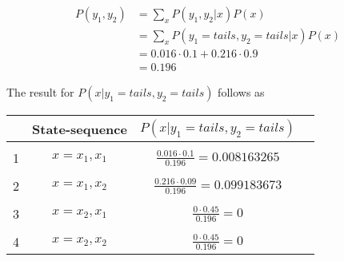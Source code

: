 \documentclass[a4paper, 12pt, titlepage]{article}
\begin{document}
\begin{align}
  P(y_1,y_2) &= \sum_{x} P(y_1,y_2|x) P(x)  \\
	     &= \sum_{x} P(y_1=tails,y_2=tails|x) P(x) \\
	     &= 0.016 \cdot 0.1 + 0.216 \cdot 0.9 \\
	     &= 0.196
\end{align}

The result for $P(x|y_1=tails,y_2=tails)$ follows as

\begin{tabular}{l*{2}{c}r}
              & State-sequence &  $P(x|y_1=tails,y_2=tails)$ & \\
\hline
& & & \\
1 & $x=x_1,x_1$ & $\frac{0.016 \cdot 0.1}{0.196} = 0.008163265$ \\
& & & \\
2 & $x=x_1,x_2$ & $\frac{0.216 \cdot 0.09}{0.196} =0.099183673$ \\
& & & \\
3 & $x=x_2,x_1$ & $\frac{0\cdot 0.45}{0.196} = 0$ \\
& & & \\
4 & $x=x_2,x_2$ & $\frac{0 \cdot 0.45}{0.196} = 0 $ 
 \end{tabular}
\end{document}
